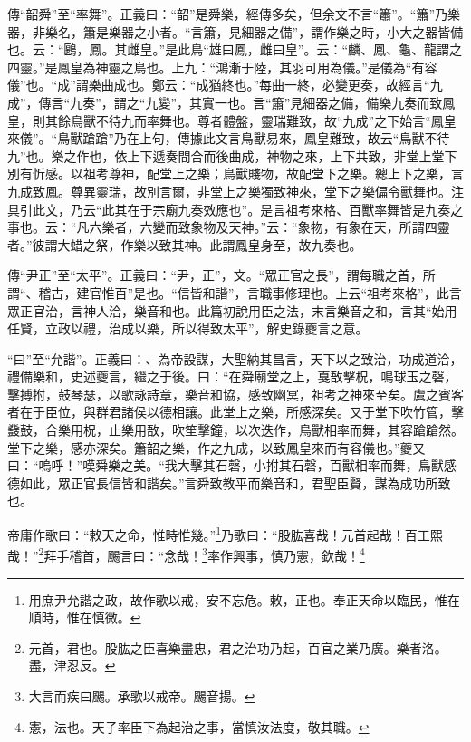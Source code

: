 {\noindent\zhuan{}\fzbyks 傳“韶舜”至“率舞”。正義曰：“韶”是舜樂，經傳多矣，但余文不言“簫”。“簫”乃樂器，非樂名，簫是樂器之小者。“言簫，見細器之備”，謂作樂之時，小大之器皆備也。云：“鶠，鳳。其雌皇。”是此鳥“雄曰鳳，雌曰皇”。云：“麟、鳳、龜、龍謂之四靈。”是鳳皇為神靈之鳥也。上九：“鴻漸于陸，其羽可用為儀。”是儀為“有容儀”也。“成”謂樂曲成也。鄭云：“成猶終也。”每曲一終，必變更奏，故經言“九成”，傳言“九奏”，謂之“九變”，其實一也。言“簫”見細器之備，備樂九奏而致鳳皇，則其餘鳥獸不待九而率舞也。尊者體盤，靈瑞難致，故“九成”之下始言“鳳皇來儀”。“鳥獸蹌蹌”乃在上句，傳據此文言鳥獸易來，鳳皇難致，故云“鳥獸不待九”也。樂之作也，依上下遞奏間合而後曲成，神物之來，上下共致，非堂上堂下別有忻感。以祖考尊神，配堂上之樂；鳥獸賤物，故配堂下之樂。總上下之樂，言九成致鳳。尊異靈瑞，故別言爾，非堂上之樂獨致神來，堂下之樂偏令獸舞也。注具引此文，乃云“此其在于宗廟九奏效應也”。是言祖考來格、百獸率舞皆是九奏之事也。云：“凡六樂者，六變而致象物及天神。”云：“象物，有象在天，所謂四靈者。”彼謂大蜡之祭，作樂以致其神。此謂鳳皇身至，故九奏也。 \par}

{\noindent\zhuan{}\fzbyks 傳“尹正”至“太平”。正義曰：“尹，正”，文。“眾正官之長”，謂每職之首，所謂“、稽古，建官惟百”是也。“信皆和諧”，言職事修理也。上云“祖考來格”，此言眾正官治，言神人洽，樂音和也。此篇初說用臣之法，末言樂音之和，言其“始用任賢，立政以禮，治成以樂，所以得致太平”，解史錄夔言之意。 \par}

{\noindent\shu{}\fzkt “曰”至“允諧”。正義曰：、為帝設謀，大聖納其昌言，天下以之致治，功成道洽，禮備樂和，史述夔言，繼之于後。曰：“在舜廟堂之上，戛敔擊柷，鳴球玉之磬，擊搏拊，鼓琴瑟，以歌詠詩章，樂音和協，感致幽冥，祖考之神來至矣。虞之賓客者在于臣位，與群君諸侯以德相讓。此堂上之樂，所感深矣。又于堂下吹竹管，擊鼗鼓，合樂用柷，止樂用敔，吹笙擊鐘，以次迭作，鳥獸相率而舞，其容蹌蹌然。堂下之樂，感亦深矣。簫韶之樂，作之九成，以致鳳皇來而有容儀也。”夔又曰：“嗚呼！”嘆舜樂之美。“我大擊其石磬，小拊其石磬，百獸相率而舞，鳥獸感德如此，眾正官長信皆和諧矣。”言舜致教平而樂音和，君聖臣賢，謀為成功所致也。 \par}

帝庸作歌曰：“敕天之命，惟時惟幾。”\footnote{用庶尹允諧之政，故作歌以戒，安不忘危。敕，正也。奉正天命以臨民，惟在順時，惟在慎微。}乃歌曰：“股肱喜哉！元首起哉！百工熙哉！”\footnote{元首，君也。股肱之臣喜樂盡忠，君之治功乃起，百官之業乃廣。樂者洛。盡，津忍反。}拜手稽首，颺言曰：“念哉！\footnote{大言而疾曰颺。承歌以戒帝。颺音揚。}率作興事，慎乃憲，欽哉！\footnote{憲，法也。天子率臣下為起治之事，當慎汝法度，敬其職。}


